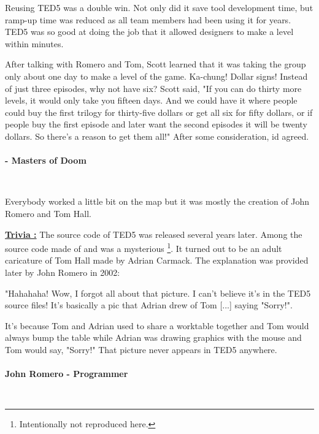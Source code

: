 \documentclass[book.tex]{subfiles}
\begin{document}
Reusing TED5 was a double win. Not only did it save tool development time, but ramp-up time was reduced as all team members had been using it for years. TED5 was so good at doing the job that it allowed designers to make a level within minutes.\\
\par

 \begin{fancyquotes}
After talking with Romero and Tom, Scott learned that it was taking the group only about one day to make a level of the game. Ka-chung! Dollar signs! Instead of just three episodes, why not have six? Scott said, "If you can do thirty more levels, it would only take you fifteen days. And we could have it where people could buy the first trilogy for thirty-five dollars or get all six for fifty dollars, or if people buy the first episode and later want the second episodes it will be twenty dollars. So there's a reason to get them all!" After some consideration, id agreed.\\
\\
 \textbf{- Masters of Doom}
 \end{fancyquotes}\\

\par
Everybody worked a little bit on the map but it was mostly the creation of John Romero and Tom Hall.\\
\par
 \textbf{\underline{Trivia :}} The source code of TED5 was released several years later. Among the source code made of  and  was a mysterious \footnote{Intentionally not reproduced here.}. It turned out to be an adult caricature of Tom Hall made by Adrian Carmack. The explanation was provided later by John Romero in 2002:\\
\par
 \begin{fancyquotes}
   "Hahahaha! Wow, I forgot all about that picture. I can't believe it's 
in the TED5 source files! It's basically a pic that Adrian drew of Tom 
[...] saying "Sorry!".\\
\par 
It's because Tom and Adrian used to share a worktable together and Tom 
would always bump the table while Adrian was drawing graphics with the 
mouse and Tom would say, "Sorry!" That picture never appears in TED5 
anywhere.\\
   \\
\textbf{John Romero - Programmer}
 \end{fancyquotes}\\
\end{document}

